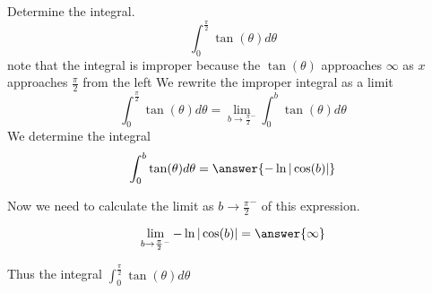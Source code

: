 \documentclass{ximera}
\author{Jason Miller}
\begin{document}
\begin{exercise}
Determine the integral.
\[
\int_{0}^{\frac{\pi}{2}} \tan(\theta) d\theta 
\]
note that the integral is improper because the $\tan(\theta)$
approaches $\infty$ as $x$ approaches $\frac{\pi}{2}$ from the left We
rewrite the improper integral as a limit
\[
\int_{0}^{\frac{\pi}{2}} \tan(\theta) d\theta=\lim_{b \to {\frac{\pi}{2}}^{-}} \int_{0}^{b} \tan(\theta) d\theta
\]
We determine the integral
\[
\int_{0}^{b} \tan(\theta) d\theta= \answer{-\ln|\cos(b)| }
\]

\begin{exercise}
Now we need to calculate the limit as $b \to {\frac{\pi}{2}}^{-}$ of this expression. 

\[
\lim_{b \to {\frac{\pi}{2}}^{-}} -\ln| \cos(b) |= \answer{  \infty }
\]

\begin{exercise}
Thus the integral $\int_{0}^{\frac{\pi}{2}} \tan(\theta) d\theta$ 

\begin{multipleChoice}
\end{multipleChoice}




\end{exercise}
\end{exercise}
\end{exercise}
\end{document}
